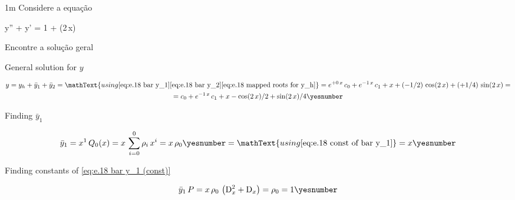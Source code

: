 \documentclass["AM3C-Slides_annotations.tex"]{subfiles}
\begin{document}
\begin{exampleBox}1m{} %
  Considere a equação
  \begin{BM}
    y'' + y' = 1 + \cos(2\,x)
  \end{BM}
  Encontre a solução geral


  \answer{\eqref{eq:e.18 answer}}

  General solution for \(y\)
  \begin{tcolorbox}
    \begin{gather*}
      y
      = y_h 
      + \bar{y}_1
      + \bar{y}_2
      = \mathText{using 
        \eqref{eq:e.18 bar y_1}
        \eqref{eq:e.18 bar y_2}
        \eqref{eq:e.18 mapped roots for y_h}
      }
      = e^{+0\,x}\,c_0
      + e^{-1\,x}\,c_1
      + x
      + (-1/2)\,\cos(2\,x)
      + (+1/4)\,\sin(2\,x)
      = \\
      = c_0
      + e^{-1\,x}\,c_1
      + x
      - \cos(2\,x)/2
      + \sin(2\,x)/4
      \yesnumber\label{eq:e.18 answer}
    \end{gather*}
  \end{tcolorbox}




  Finding \(\bar{y}_1\)
  \begin{tcolorbox}
    \begin{gather*}
      \bar{y}_1
      = x^1
      \,Q_0(x)
      = x
      \,\sum_{i=0}^{0}{
        \rho_i\,x^i
      }
      = x\,\rho_0
      \yesnumber\label{eq:e.18 bar y_1 (const)}
      = \mathText{using \eqref{eq:e.18 const of bar y_1}}
      = x
      \yesnumber\label{eq:e.18 bar y_1}
    \end{gather*}
  \end{tcolorbox}

  Finding constants of \eqref{eq:e.18 bar y_1 (const)}
  \begin{tcolorbox}
    \begin{gather*}
      \bar{y}_1\,P
      = x\,\rho_0
      \,\left(
        \mdif[2]{x} + \mdif{x}
      \right)
      = \rho_0
      = 1
      \yesnumber\label{eq:e.18 const of bar y_1}
    \end{gather*}
  \end{tcolorbox}


\end{exampleBox}
\end{document}
